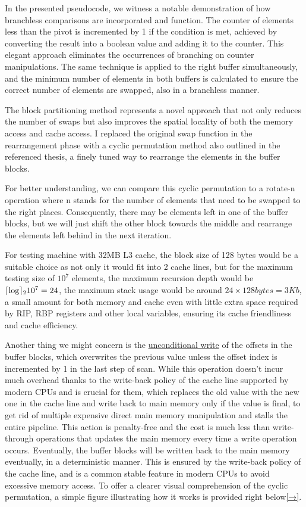 \documentclass[a4paper,oneside,12pt]{book}
\DeclarePairedDelimiter\ceil{\lceil}{\rceil}
\begin{document}
In the presented pseudocode, we witness a notable demonstration of how branchless comparisons are incorporated and function. The counter of elements less than the pivot is incremented by 1 if the condition is met, achieved by converting the result into a boolean value and adding it to the counter. 
This elegant approach eliminates the occurrences of branching on counter manipulations. The same technique is applied to the right buffer simultaneously, and the minimum number of elements in both buffers is calculated to ensure the correct number of elements are swapped, also in a branchless manner.

The block partitioning method represents a novel approach that not only reduces the number of swaps but also improves the spatial locality of both the memory access and cache access.
I replaced the original swap function in the rearrangement phase with a cyclic permutation method also outlined in the referenced thesis, a finely tuned way to rearrange the elements in the buffer blocks.

For better understanding, we can compare this cyclic permutation to a rotate-n operation where n stands for the number of elements that need to be swapped to the right places.
Consequently, there may be elements left in one of the buffer blocks, but we will just shift the other block towards the middle and rearrange the elements left behind in the next iteration.

For testing machine with 32MB L3 cache, the block size of 128 bytes would be a suitable choice as not only it would fit into 2 cache lines, but for the maximum testing size of $10^7$ elements, the maximum recursion depth would be $\ceil\log_{2} 10^7 = 24$,
the maximum stack usage would be around $24 \times 128{bytes} = 3{Kb}$, a small amount for both memory and cache even with little extra space required by RIP, RBP registers and other local variables, ensuring its cache friendliness and cache efficiency.

Another thing we might concern is the \hyperlink{UnconditionalWrite}{unconditional write} of the offsets in the buffer blocks, which overwrites the previous value unless the offset index is incremented by 1 in the last step of scan.
While this operation doesn't incur much overhead thanks to the write-back policy of the cache line supported by modern CPUs and is crucial for them, which replaces the old value with the new one in the cache line and write back to main memory only if the value is final,
to get rid of multiple expensive direct main memory manipulation and stalls the entire pipeline. This action is penalty-free and the cost is much less than write-through operations that updates the main memory every time a write operation occurs.
Eventually, the buffer blocks will be written back to the main memory eventually, in a deterministic manner.
This is ensured by the write-back policy of the cache line, and is a common stable feature in modern CPUs to avoid excessive memory access.
To offer a clearer visual comprehension of the cyclic permutation, a simple figure illustrating how it works is provided right below\hyperlink{fig:cyclicpermu}{[→]}.
\end{document}
